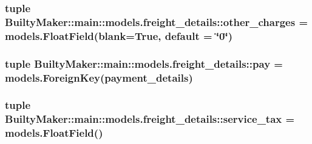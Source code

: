 \hypertarget{classBuiltyMaker_1_1main_1_1models_1_1freight__details_a5b9fa8dd23def7cf7356af4e17caafd7}{
\subsubsection[{other\-\_\-charges}]{\setlength{\rightskip}{0pt plus 5cm}tuple {\bf \-Builty\-Maker\-::main\-::models.\-freight\-\_\-details\-::other\-\_\-charges} = models.\-Float\-Field(blank=\-True, default = \char`\"{}0\char`\"{})}}\label{classBuiltyMaker_1_1main_1_1models_1_1freight__details_a5b9fa8dd23def7cf7356af4e17caafd7}
\hypertarget{classBuiltyMaker_1_1main_1_1models_1_1freight__details_ae689ac649f8e8531feb16b2b94f5d3a1}{
\subsubsection[{pay}]{\setlength{\rightskip}{0pt plus 5cm}tuple {\bf \-Builty\-Maker\-::main\-::models.\-freight\-\_\-details\-::pay} = models.\-Foreign\-Key({\bf payment\-\_\-details})}}\label{classBuiltyMaker_1_1main_1_1models_1_1freight__details_ae689ac649f8e8531feb16b2b94f5d3a1}
\hypertarget{classBuiltyMaker_1_1main_1_1models_1_1freight__details_a7f9af78a5d9cc0e4ebfe792a612a349a}{
\subsubsection[{service\-\_\-tax}]{\setlength{\rightskip}{0pt plus 5cm}tuple {\bf \-Builty\-Maker\-::main\-::models.\-freight\-\_\-details\-::service\-\_\-tax} = models.\-Float\-Field()}}\label{classBuiltyMaker_1_1main_1_1models_1_1freight__details_a7f9af78a5d9cc0e4ebfe792a612a349a}
